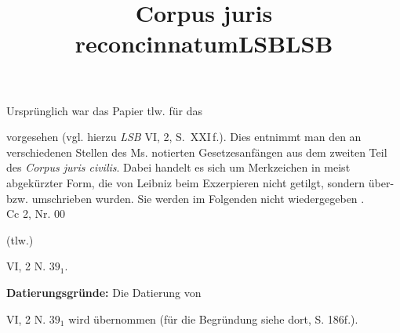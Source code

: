 \begin{ledgroupsized}[r]{114mm}
Urspr\"{u}nglich war das Papier tlw. f\"{u}r das \title{Corpus juris reconcinnatum}\cite{01000} vorgesehen (vgl. hierzu \textit{LSB} VI, 2, S.~XXI\,f.).
Dies entnimmt man den an verschiedenen Stellen des Ms. notierten Gesetzesanf\"{a}ngen aus dem zweiten Teil des \textit{Corpus juris civilis}.
Dabei handelt es sich um Merkzeichen in meist abgek\"{u}rzter Form, die von Leibniz beim Exzerpieren nicht getilgt, sondern \"{u}ber- bzw. umschrieben wurden.
Sie werden im Folgenden nicht wiedergegeben%
.\\%
Cc 2, Nr. 00
\pend
\end{ledgroupsized}
%
\begin{ledgroupsized}[r]{114mm}
\footnotesize 
\pstart \parindent -6mm
%
(tlw.) \cite{01120}\title{LSB} VI, 2 N. $39_1$. %
\pend
\end{ledgroupsized}
\vspace*{5mm}
\begin{ledgroup} 
\footnotesize 
%
\count{}
\count{}
\count{}
\pstart
\noindent\footnotesize{\textbf{Datierungsgr\"{u}nde:}
Die Datierung von \cite{01120}\title{LSB} VI, 2 N. $39_1$ wird übernommen (für die Begründung siehe dort, S. 186f.).
}
\pend
\end{ledgroup}
